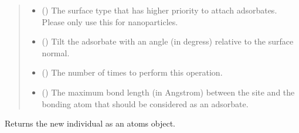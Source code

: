 \documentclass[letterpaper,10pt,english]{sphinxmanual}
\begin{document}
\begin{fulllineitems}
\begin{quote}
\begin{description}
\begin{itemize}
\item {} 
 (\sphinxstyleliteralemphasis{\sphinxupquote{, }}) \textendash{} The surface type that has higher priority to attach adsorbates.
Please only use this for nanoparticles.

\item {} 
 (\sphinxstyleliteralemphasis{\sphinxupquote{, }}) \textendash{} Tilt the adsorbate with an angle (in degress) relative to the
surface normal.

\item {} 
 (\sphinxstyleliteralemphasis{\sphinxupquote{, }}) \textendash{} The number of times to perform this operation.

\item {} 
 (\sphinxstyleliteralemphasis{\sphinxupquote{, }}) \textendash{} The maximum bond length (in Angstrom) between the site and the
bonding atom  that should be considered as an adsorbate.

\end{itemize}

\end{description}\end{quote}

\begin{fulllineitems}
\label{\detokenize{ga:acat.ga.adsorbate_operators.AddAdsorbate.get_new_individual}}
Returns the new individual as an atoms object.

\end{fulllineitems}


\end{fulllineitems}

\end{document}
